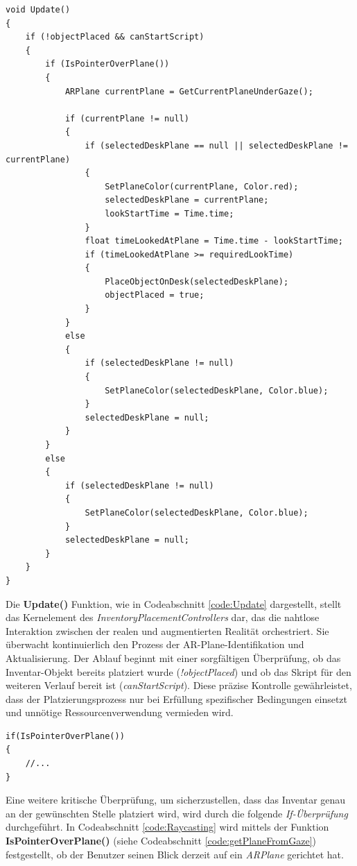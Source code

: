 \begin{lstlisting}[style=csharp, caption={Update Funktion}, label=code:Update]
void Update()
{
    if (!objectPlaced && canStartScript)
    {
        if (IsPointerOverPlane())
        {
            ARPlane currentPlane = GetCurrentPlaneUnderGaze();

            if (currentPlane != null)
            {
                if (selectedDeskPlane == null || selectedDeskPlane != currentPlane)
                {
                    SetPlaneColor(currentPlane, Color.red);
                    selectedDeskPlane = currentPlane;
                    lookStartTime = Time.time;
                }
                float timeLookedAtPlane = Time.time - lookStartTime;
                if (timeLookedAtPlane >= requiredLookTime)
                {
                    PlaceObjectOnDesk(selectedDeskPlane);
                    objectPlaced = true;
                }
            }
            else
            {
                if (selectedDeskPlane != null)
                {
                    SetPlaneColor(selectedDeskPlane, Color.blue);
                }
                selectedDeskPlane = null;
            }
        }
        else
        {
            if (selectedDeskPlane != null)
            {
                SetPlaneColor(selectedDeskPlane, Color.blue);
            }
            selectedDeskPlane = null;
        }
    }
}
\end{lstlisting}

Die \textbf{Update()} Funktion, wie in Codeabschnitt \ref{code:Update} dargestellt, stellt das Kernelement des
\textit{InventoryPlacementControllers} dar, das die nahtlose Interaktion zwischen der realen und augmentierten Realität
orchestriert. Sie überwacht kontinuierlich den Prozess der AR-Plane-Identifikation und Aktualisierung. Der Ablauf beginnt
mit einer sorgfältigen Überprüfung, ob das Inventar-Objekt bereits platziert wurde (\textit{!objectPlaced}) und ob das
Skript für den weiteren Verlauf bereit ist (\textit{canStartScript}). Diese präzise Kontrolle gewährleistet, dass der
Platzierungsprozess nur bei Erfüllung spezifischer Bedingungen einsetzt und unnötige Ressourcenverwendung vermieden wird.\\

\begin{lstlisting}[style=csharp, caption={Raycasting}, label=code:Raycasting]
if(IsPointerOverPlane())
{
    //...
}
\end{lstlisting}
Eine weitere kritische Überprüfung, um sicherzustellen, dass das Inventar genau an der gewünschten Stelle platziert wird,
wird durch die folgende \textit{If-Überprüfung} durchgeführt. In Codeabschnitt \ref{code:Raycasting} wird mittels der
Funktion \textbf{IsPointerOverPlane()} (siehe Codeabschnitt \ref{code:getPlaneFromGaze}) festgestellt, ob der Benutzer
seinen Blick derzeit auf ein \textit{ARPlane} gerichtet hat.

